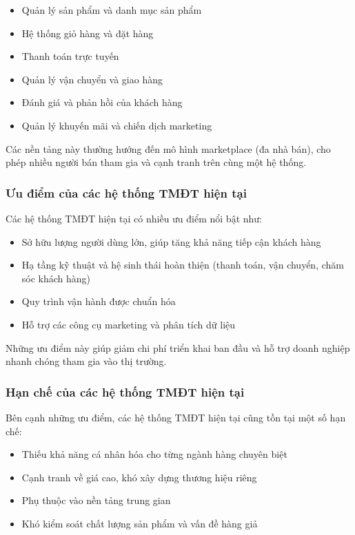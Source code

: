 \documentclass[13pt]{article}
\begin{document}
\begin{itemize}
    \item Quản lý sản phẩm và danh mục sản phẩm
    \item Hệ thống giỏ hàng và đặt hàng
    \item Thanh toán trực tuyến
    \item Quản lý vận chuyển và giao hàng
    \item Đánh giá và phản hồi của khách hàng
    \item Quản lý khuyến mãi và chiến dịch marketing
\end{itemize}

Các nền tảng này thường hướng đến mô hình marketplace (đa nhà bán), cho phép nhiều người bán tham gia và cạnh tranh trên cùng một hệ thống.

\subsubsection{Ưu điểm của các hệ thống TMĐT hiện tại}

Các hệ thống TMĐT hiện tại có nhiều ưu điểm nổi bật như:

\begin{itemize}
    \item Sở hữu lượng người dùng lớn, giúp tăng khả năng tiếp cận khách hàng
    \item Hạ tầng kỹ thuật và hệ sinh thái hoàn thiện (thanh toán, vận chuyển, chăm sóc khách hàng)
    \item Quy trình vận hành được chuẩn hóa
    \item Hỗ trợ các công cụ marketing và phân tích dữ liệu
\end{itemize}

Những ưu điểm này giúp giảm chi phí triển khai ban đầu và hỗ trợ doanh nghiệp nhanh chóng tham gia vào thị trường.

\subsubsection{Hạn chế của các hệ thống TMĐT hiện tại}

Bên cạnh những ưu điểm, các hệ thống TMĐT hiện tại cũng tồn tại một số hạn chế:

\begin{itemize}
    \item Thiếu khả năng cá nhân hóa cho từng ngành hàng chuyên biệt
    \item Cạnh tranh về giá cao, khó xây dựng thương hiệu riêng
    \item Phụ thuộc vào nền tảng trung gian
    \item Khó kiểm soát chất lượng sản phẩm và vấn đề hàng giả
\end{itemize}
\end{document}
